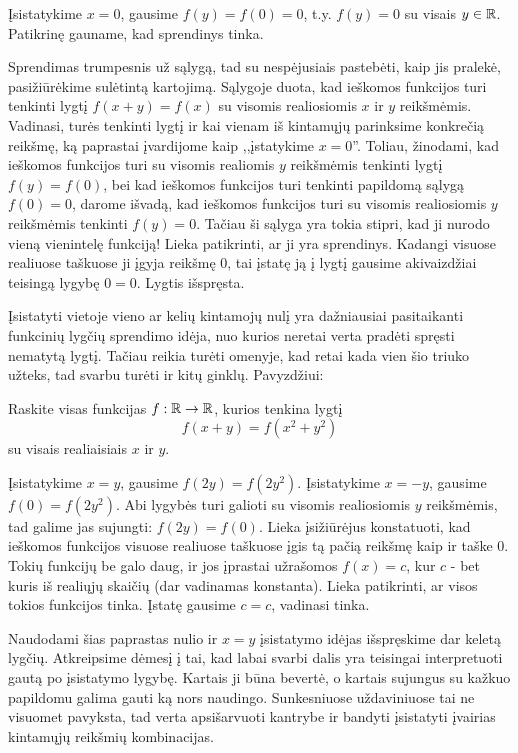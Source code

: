\begin{sprendimas} Įsistatykime $x=0$, gausime $f(y)=f(0)=0$, t.y. $f(y)=0$
  su visais $y \in \mathbb R$. Patikrinę gauname, kad sprendinys tinka.
\end{sprendimas}

Sprendimas trumpesnis už sąlygą, tad su nespėjusiais pastebėti, kaip jis
pralekė, pasižiūrėkime sulėtintą kartojimą. Sąlygoje duota, kad ieškomos
funkcijos turi tenkinti lygtį $f(x+y) = f(x)$ su visomis realiosiomis $x$
ir $y$ reikšmėmis. Vadinasi, turės tenkinti lygtį ir kai vienam iš
kintamųjų parinksime konkrečią reikšmę, ką paprastai įvardijome kaip
,,įstatykime $x=0$''. Toliau, žinodami, kad ieškomos funkcijos turi su
visomis realiomis $y$ reikšmėmis tenkinti lygtį $f(y) = f(0)$, bei kad
ieškomos funkcijos turi tenkinti papildomą sąlygą $f(0)=0$, darome išvadą,
kad ieškomos funkcijos turi su visomis realiosiomis $y$ reikšmėmis tenkinti
$f(y)=0$. Tačiau ši sąlyga yra tokia stipri, kad ji nurodo vieną vienintelę
funkciją! Lieka patikrinti, ar ji yra sprendinys. Kadangi visuose realiuose
taškuose ji įgyja reikšmę $0$, tai įstatę ją į lygtį gausime akivaizdžiai
teisingą lygybę $0=0$. Lygtis išspręsta.

Įsistatyti vietoje vieno ar kelių kintamojų nulį yra dažniausiai
pasitaikanti funkcinių lygčių sprendimo idėja, nuo kurios neretai verta
pradėti spręsti nematytą lygtį. Tačiau reikia turėti omenyje, kad retai
kada vien šio triuko užteks, tad svarbu turėti ir kitų ginklų.
Pavyzdžiui:

\begin{pavnr}Raskite visas funkcijas $f:\mathbb R \to \mathbb R$, kurios tenkina lygtį
  $$f(x+y)=f(x^2+y^2)$$ su visais realiaisiais $x$ ir $y$.
\end{pavnr}

\begin{sprendimas}
  Įsistatykime $x=y$, gausime $f(2y)=f(2y^2)$. Įsistatykime $x=-y$, gausime
  $f(0) = f(2y^2)$. Abi lygybės turi galioti su visomis realiosiomis $y$
  reikšmėmis, tad galime jas sujungti: $f(2y)=f(0)$. Lieka įsižiūrėjus
  konstatuoti, kad ieškomos funkcijos visuose realiuose taškuose įgis tą
  pačią reikšmę kaip ir taške $0$. Tokių funkcijų be galo daug, ir jos
  įprastai užrašomos $f(x)=c$, kur $c$ - bet kuris iš realiųjų skaičių (dar
  vadinamas konstanta). Lieka patikrinti, ar visos tokios funkcijos tinka.
  Įstatę gausime $c=c$, vadinasi tinka.
\end{sprendimas}

Naudodami šias paprastas nulio ir $x=y$ įsistatymo idėjas išspręskime dar
keletą lygčių. Atkreipsime dėmesį į tai, kad labai svarbi dalis yra
teisingai interpretuoti gautą po įsistatymo lygybę. Kartais ji būna
bevertė, o kartais sujungus su kažkuo papildomu galima gauti ką nors
naudingo.  Sunkesniuose uždaviniuose tai ne visuomet pavyksta, tad verta
apsišarvuoti kantrybe ir bandyti įsistatyti įvairias kintamųjų reikšmių
kombinacijas.

